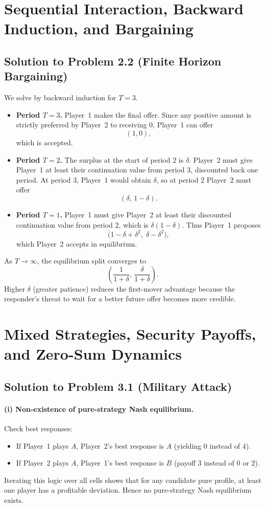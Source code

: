 \documentclass[12pt,a4paper]{article}
\begin{document}
\section{Sequential Interaction, Backward Induction, and Bargaining}

\subsection*{Solution to Problem 2.2 (Finite Horizon Bargaining)}

We solve by backward induction for \(T = 3\).
\begin{itemize}
  \item \textbf{Period \(T = 3\).} Player~1 makes the final offer. Since any positive amount is strictly preferred by Player~2 to receiving \(0\), Player~1 can offer
  \[
    (1,0),
  \]
  which is accepted.
  \item \textbf{Period \(T = 2\).} The surplus at the start of period \(2\) is \(\delta\). Player~2 must give Player~1 at least their continuation value from period \(3\), discounted back one period. At period \(3\), Player~1 would obtain \(\delta\), so at period \(2\) Player~2 must offer
  \[
    (\delta,\, 1-\delta).
  \]
  \item \textbf{Period \(T = 1\).} Player~1 must give Player~2 at least their discounted continuation value from period \(2\), which is \(\delta(1-\delta)\). Thus Player~1 proposes
  \[
    \bigl(1 - \delta + \delta^2,\; \delta - \delta^2\bigr),
  \]
  which Player~2 accepts in equilibrium.
\end{itemize}

As \(T \to \infty\), the equilibrium split converges to
\[
  \left(\frac{1}{1+\delta},\, \frac{\delta}{1+\delta}\right).
\]
Higher \(\delta\) (greater patience) reduces the first-mover advantage because the responder's threat to wait for a better future offer becomes more credible.

\section{Mixed Strategies, Security Payoffs, and Zero-Sum Dynamics}

\subsection*{Solution to Problem 3.1 (Military Attack)}

\paragraph{(i) Non-existence of pure-strategy Nash equilibrium.}
Check best responses:
\begin{itemize}
  \item If Player~1 plays \(A\), Player~2's best response is \(A\) (yielding \(0\) instead of \(4\)).
  \item If Player~2 plays \(A\), Player~1's best response is \(B\) (payoff \(3\) instead of \(0\) or \(2\)).
\end{itemize}
Iterating this logic over all cells shows that for any candidate pure profile, at least one player has a profitable deviation. Hence no pure-strategy Nash equilibrium exists.
\end{document}
